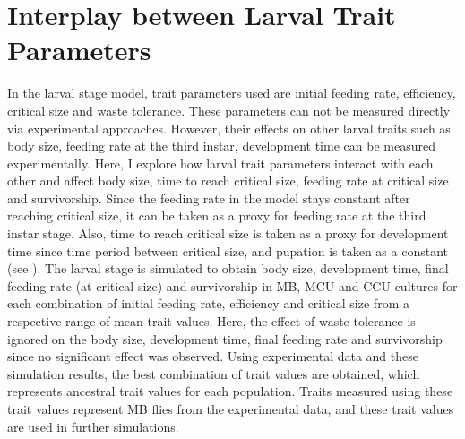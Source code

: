 \chapter{Interplay between Larval Trait Parameters}
In the larval stage model, trait parameters used are initial feeding rate, efficiency, critical size and waste tolerance. These parameters can not be measured directly via experimental approaches. However, their effects on other larval traits such as body size, feeding rate at the third instar, development time can be measured experimentally. Here, I explore how larval trait parameters interact with each other and affect body size, time to reach critical size, feeding rate at critical size and survivorship. Since the feeding rate in the model stays constant after reaching critical size, it can be taken as a proxy for feeding rate at the third instar stage. Also, time to reach critical size is taken as a proxy for development time since time period between critical size, and pupation is taken as a constant (see \cite{santosDensityDependentNaturalSelection1997}). The larval stage is simulated to obtain body size, development time, final feeding rate (at critical size) and survivorship in MB, MCU and CCU cultures for each combination of initial feeding rate, efficiency and critical size from a respective range of mean trait values. Here, the effect of waste tolerance is ignored on the body size, development time, final feeding rate and survivorship since no significant effect was observed. Using experimental data and these simulation results, the best combination of trait values are obtained, which represents ancestral trait values for each population. Traits measured using these trait values represent MB flies from the experimental data, and these trait values are used in further simulations.

